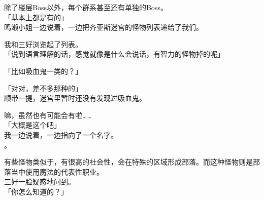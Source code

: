 除了楼层Boss以外，每个群系甚至还有单独的Boss。\\

「基本上都是有的」\\

鸣濑小姐一边说着，一边把齐亚斯迷宫的怪物列表递给了我们。

我和三好浏览起了列表。\\

「说到语言理解的话，感觉就像是什么会说话，有智力的怪物掉的呢」

「比如吸血鬼一类的？」

「对对，差不多那种的」\\

顺带一提，迷宫里暂时还没有发现过吸血鬼。

嘛，虽然也有可能会有啦……\\

「大概是这个吧」\\

我一边说着，一边指向了一个名字。\\

。

有些怪物类似于，有很高的社会性，会在特殊的区域形成部落。而这种怪物则是部落当中使用魔法的代表性职业。\\

三好一脸疑惑地问到。\\

「你怎么知道的？」

